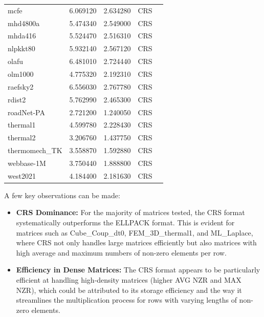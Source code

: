\documentclass[12pt,oneside]{book} %
\begin{document}
\begin{longtable}{lcccr}
    mcfe              & 6.069120     & 2.634280         & CRS                     \\
    mhd4800a          & 5.474340     & 2.549000         & CRS                     \\
    mhda416           & 5.524470     & 2.516310         & CRS                     \\
    nlpkkt80          & 5.932140     & 2.567120         & CRS                     \\
    olafu             & 6.481010     & 2.724440         & CRS                     \\
    olm1000           & 4.775320     & 2.192310         & CRS                     \\
    raefsky2          & 6.556030     & 2.767780         & CRS                     \\
    rdist2            & 5.762990     & 2.465300         & CRS                     \\
    roadNet-PA        & 2.721200     & 1.240050         & CRS                     \\
    thermal1          & 4.599780     & 2.228430         & CRS                     \\
    thermal2          & 3.206760     & 1.437750         & CRS                     \\
    thermomech\_TK    & 3.558870     & 1.592880         & CRS                     \\
    webbase-1M        & 3.750440     & 1.888800         & CRS                     \\
    west2021          & 4.184400     & 2.181630         & CRS                     \\
\end{longtable}

A few key observations can be made:
\begin{itemize}
    \item \textbf{CRS Dominance:} For the majority of matrices tested, the CRS format systematically outperforms the ELLPACK format. This is evident for matrices such as Cube\_Coup\_dt0, FEM\_3D\_thermal1, and ML\_Laplace, where CRS not only handles large matrices efficiently but also matrices with high average and maximum numbers of non-zero elements per row.
    \item \textbf{Efficiency in Dense Matrices:} The CRS format appears to be particularly efficient at handling high-density matrices (higher AVG NZR and MAX NZR), which could be attributed to its storage efficiency and the way it streamlines the multiplication process for rows with varying lengths of non-zero elements.
\end{itemize}
\end{document}
